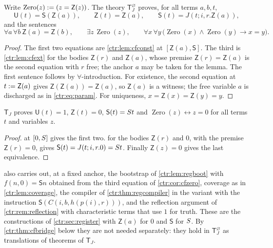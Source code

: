 \begin{corollary}\label{ctr:cor:cfzero}
Write $\operatorname{Zero}(z)\mathrel{:=}(z=\mathsf Z(z))$. The theory $\mathsf T_J^{\varnothing}$
proves, for all terms $a,b,t$,
\[
 \mathsf U(t)=\mathsf S(\mathsf Z(a)),\qquad \mathsf Z(t)=\mathsf Z(a),\qquad
 \mathsf S(t)=J(t;i,r.\mathsf Z(a)),
\]
and the sentences
\[
 \forall a\,\forall b\ \mathsf Z(a)=\mathsf Z(b),\qquad
 \exists z\,\operatorname{Zero}(z),\qquad
 \forall x\,\forall y\,\bigl(\operatorname{Zero}(x)\land\operatorname{Zero}(y)\to x=y\bigr).
\]
\end{corollary}
\begin{proof}
The first two equations are \cref{ctr:lem:cfconst} at $[\mathsf Z(a),\mathsf S]$. The third
is \cref{ctr:lem:cfext} for the bodies $\mathsf Z(r)$ and $\mathsf Z(a)$, whose premise
$\mathsf Z(r)=\mathsf Z(a)$ is the second equation with $r$ free; the anchor $a$ may be
taken for the lemma. The first sentence follows by $\forall$-introduction. For existence,
the second equation at $t\mathrel{:=}\mathsf Z(a)$ gives $\mathsf Z(\mathsf Z(a))=\mathsf Z(a)$,
so $\mathsf Z(a)$ is a witness; the free variable $a$ is discharged as in
\eqref{ctr:eq:param}. For uniqueness, $x=\mathsf Z(x)=\mathsf Z(y)=y$.
\end{proof}

\begin{corollary}\label{ctr:cor:cfTJ}
$\mathsf T_J$ proves $\mathsf U(t)=1$, $\mathsf Z(t)=0$, $\mathsf S(t)=S t$ and
$\operatorname{Zero}(z)\leftrightarrow z=0$ for all terms $t$ and variables $z$.
\end{corollary}
\begin{proof}
 at $[0,S]$ gives the first two.  for the
bodies $\mathsf Z(r)$ and $0$, with the premise $\mathsf Z(r)=0$, gives
$\mathsf S(t)=J(t;i,r.0)=S t$. Finally $\mathsf Z(z)=0$ gives the last equivalence.
\end{proof}

\begin{remark}
 also carries out, at a fixed anchor, the bootstrap of
\cref{ctr:lem:regboot} with $f(n,0)=\mathsf S n$ obtained from the third equation of
\cref{ctr:cor:cfzero}, coverage as in \cref{ctr:lem:coverage}, the compiler of
\cref{ctr:thm:regcompiler} in the variant with the instruction
$\mathsf S(C(i,b,h(p(i),r)))$, and the reflection argument of \cref{ctr:rem:reflection} with
characteristic terms that use $1$ for truth. These are the constructions of
\cref{ctr:sec:register} with $\mathsf Z(a)$ for $0$ and $\mathsf S$ for $S$. By
\cref{ctr:thm:cfbridge} below they are not needed separately: they hold in
$\mathsf T_J^{\varnothing}$ as translations of theorems of $\mathsf T_J$.
\end{remark}

